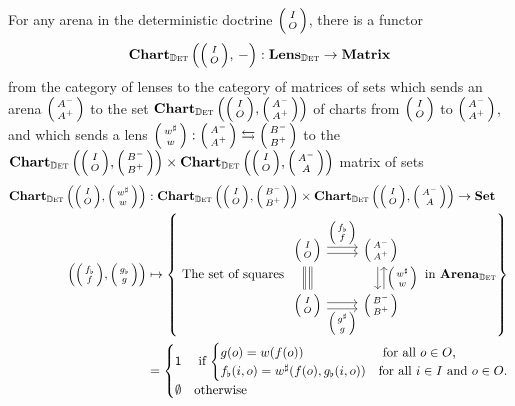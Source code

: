 \documentclass[DynamicalBook]{subfiles}
\begin{document}
\begin{proposition}\label{prop.lens_to_matrix_functor_discrete}
  For any arena in the deterministic doctrine $\lens{I}{O}$, there is a functor 
$$\Cat{Chart}_{\determ}\left( \littlelens{I}{O},\, - \right) : \Cat{Lens}_{\determ} \to \Cat{Matrix}$$
from the category of lenses to the category of matrices of sets which sends an
arena $\lens{A^-}{A^+}$ to the set $\Cat{Chart}_{\determ}\left( \lens{I}{O},
  \lens{A^-}{A^+} \right)$ of charts from $\lens{I}{O}$ to $\lens{A^-}{A^+}$,
and which sends a lens $\lens{w^{\sharp}}{w} : \lens{A^-}{A^+} \fromto
\lens{B^-}{B^+}$ to the $\Cat{Chart}_{\determ}\left( \lens{I}{O}, \lens{B^-}{B^+} \right)
\times \Cat{Chart}_{\determ}\left( \lens{I}{O}, \lens{A^-}{A} \right)$ matrix of sets
\begin{align*}
 \Cat{Chart}_{\determ}\left( \littlelens{I}{O}, \littlelens{w^{\sharp}}{w} \right) &: \Cat{Chart}_{\determ}\left( \littlelens{I}{O}, \littlelens{B^-}{B^+} \right)
\times \Cat{Chart}_{\determ}\left( \littlelens{I}{O}, \littlelens{A^-}{A} \right) \to \smset \\
\left( \littlelens{f_{\flat}}{f}, \littlelens{g_{\flat}}{g} \right) &\mapsto \left\{ \mbox{ The set of squares }
      \begin{tikzcd}[ampersand replacement = \&]
        \lens{I}{O} \ar[r, shift left, "\lens{f_{\flat}}{f}"] \ar[r, shift
        right] \ar[d, shift right, equals] \ar[d, shift left,
        leftarrow, equals] \& \lens{A^-}{A^+} \ar[d, shift left, leftarrow,
        "\lens{w^{\sharp}}{w}"] \ar[d, shift right]\\
        \lens{I}{O} \ar[r, shift right, "\lens{g^{\sharp}}{g}"'] \ar[r,
        shift left] \& \lens{B^-}{B^+}
      \end{tikzcd}  \mbox{ in $\Cat{Arena}_{\determ}$}   \right\} \\
&=\begin{cases} \ord{1} &\mbox{ if \(\begin{cases} g(o) = w(f(o)) &\mbox{ for all $o \in O$,}\\ f_{\flat}(i, o) = w^{\sharp}(f(o), g_{\flat}(i, o)) &\mbox{for all $i \in I$ and $o \in O$.}\end{cases}\)} \\ \emptyset &\mbox{otherwise} \end{cases}
\end{align*}
\end{proposition}
\end{document}
